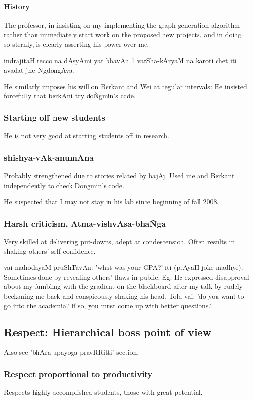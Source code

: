 \documentclass[oneside, article]{memoir}
\begin{document}
\paragraph*{History}
The professor, in insisting on my implementing the graph generation algorithm rather than immediately start work on the proposed new projects, and in doing so sternly, is clearly asserting his power over me.

indrajitaH recco na dAsyAmi yat bhavAn 1 varSha-kAryaM na karoti chet iti avadat jhe~NgdongAya.

He similarly imposes his will on Berkant and Wei at regular intervals: He insisted forcefully that berkAnt try do\~Ngmin's code.

\subsubsection{Starting off new students}
He is not very good at starting students off in research.

\subsubsection{shishya-vAk-anumAna}
Probably strengthened due to stories related by bajAj. Used me and Berkant independently to check Dongmin's code.

He suspected that I may not stay in his lab since beginning of fall 2008.

\subsubsection{Harsh criticism, Atma-vishvAsa-bha\~Nga}
Very skilled at delivering put-downs, adept at condescension. Often results in shaking others' self confidence.

vai-mahodayaM pruShTavAn: 'what was your GPA?' iti (prAyaH joke madhye). Sometimes done by revealing others' flaws in public. Eg: He expressed disapproval about my fumbling with the gradient on the blackboard after my talk by rudely beckoning me back and conspicously shaking his head. Told vai: 'do you want to go into the academia? if so, you must come up with better questions.'


\subsection{Respect: Hierarchical boss point of view}
Also see 'bhAra-upayoga-pravRRitti' section.

\subsubsection{Respect proportional to productivity}
Respects highly accomplished students, those with great potential.
\end{document}
